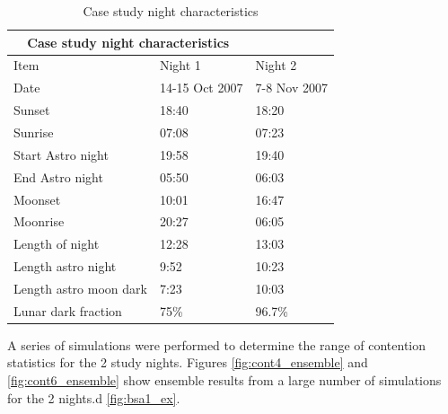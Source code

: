 \begin{table}
\begin{center}
\caption{Case study night characteristics}
\begin{tabular}{lll}
\toprule
\multicolumn{2}{c}{Case study night characteristics} \\
\midrule
Item & Night 1 & Night 2 \\
\midrule
Date                & 14-15 Oct 2007 & 7-8 Nov 2007\\
Sunset              & 18:40          & 18:20\\
Sunrise             & 07:08          & 07:23\\
Start Astro night   & 19:58          & 19:40\\
End Astro night     & 05:50          & 06:03\\
Moonset             & 10:01          & 16:47\\
Moonrise            & 20:27          & 06:05\\
\midrule
Length of night     & 12:28          & 13:03\\
Length astro night  & 9:52           & 10:23\\
Length astro moon dark    & 7:23     & 10:03\\
Lunar dark fraction & 75\%           & 96.7\%\\
\bottomrule
\end{tabular}
\end{center}
\end{table}

A series of simulations were performed to determine the range of contention statistics for the 2 study nights. Figures \ref{fig:cont4_ensemble} and \ref{fig:cont6_ensemble} show ensemble results from a large number of simulations for the 2 nights.d \ref{fig:bsa1_ex}.

